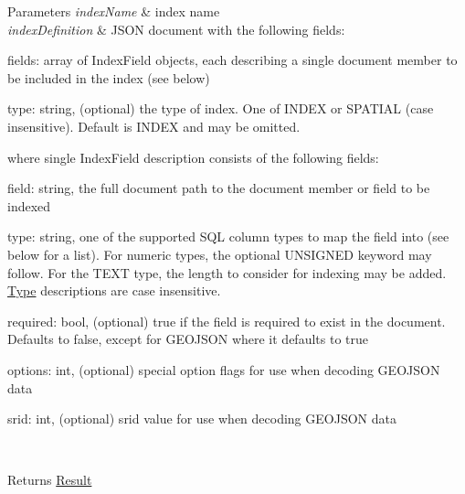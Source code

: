 \begin{DoxyParams}{Parameters}
{\em index\+Name} & index name \\
\hline
{\em index\+Definition} & J\+S\+ON document with the following fields\+: 
\begin{DoxyItemize}
\item fields\+: array of Index\+Field objects, each describing a single document member to be included in the index (see below) 
\item type\+: string, (optional) the type of index. One of I\+N\+D\+EX or S\+P\+A\+T\+I\+AL (case insensitive). Default is I\+N\+D\+EX and may be omitted. 
\end{DoxyItemize}where single Index\+Field description consists of the following fields\+: 
\begin{DoxyItemize}
\item field\+: string, the full document path to the document member or field to be indexed 
\item type\+: string, one of the supported S\+QL column types to map the field into (see below for a list). For numeric types, the optional U\+N\+S\+I\+G\+N\+ED keyword may follow. For the T\+E\+XT type, the length to consider for indexing may be added. \mbox{\hyperlink{enumcom_1_1mysql_1_1cj_1_1xdevapi_1_1_type}{Type}} descriptions are case insensitive. 
\item required\+: bool, (optional) true if the field is required to exist in the document. Defaults to false, except for G\+E\+O\+J\+S\+ON where it defaults to true 
\item options\+: int, (optional) special option flags for use when decoding G\+E\+O\+J\+S\+ON data 
\item srid\+: int, (optional) srid value for use when decoding G\+E\+O\+J\+S\+ON data 
\end{DoxyItemize}\\
\hline
\end{DoxyParams}
\begin{DoxyReturn}{Returns}
\mbox{\hyperlink{interfacecom_1_1mysql_1_1cj_1_1xdevapi_1_1_result}{Result}} 
\end{DoxyReturn}
\mbox{\label{interfacecom_1_1mysql_1_1cj_1_1xdevapi_1_1_collection_a2de7cddb075e95bfb3b880cb58fe703f}} 
